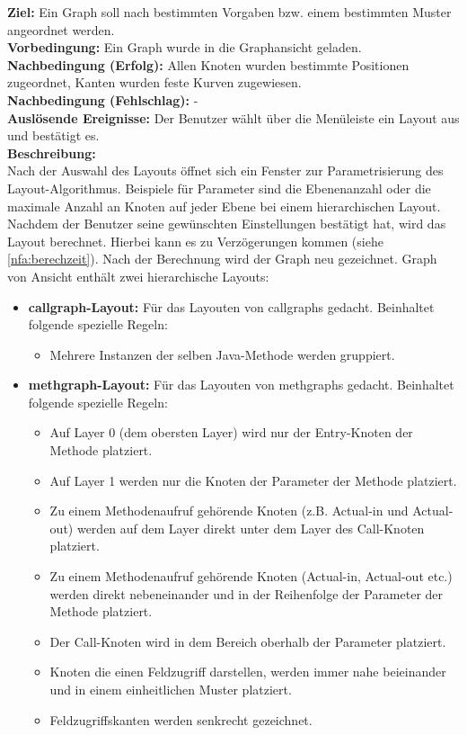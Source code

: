 \label{fa:layout}
\textbf{Ziel:} Ein Graph soll nach bestimmten Vorgaben bzw. einem bestimmten Muster angeordnet werden.\\
\textbf{Vorbedingung:} Ein Graph wurde in die Graphansicht geladen.\\
\textbf{Nachbedingung (Erfolg):} Allen Knoten wurden bestimmte Positionen zugeordnet, Kanten wurden feste Kurven zugewiesen.\\
\textbf{Nachbedingung (Fehlschlag):} -\\
\textbf{Auslösende Ereignisse:}
Der Benutzer wählt über die Menüleiste ein Layout aus und bestätigt es.\\
\textbf{Beschreibung:}\\
Nach der Auswahl des Layouts öffnet sich ein Fenster zur Parametrisierung des Layout-Algorithmus.
Beispiele für Parameter sind die Ebenenanzahl oder die maximale Anzahl an Knoten auf jeder Ebene bei einem hierarchischen Layout.
Nachdem der Benutzer seine gewünschten Einstellungen bestätigt hat, wird das Layout berechnet. Hierbei kann es zu Verzögerungen kommen (siehe \ref{nfa:berechzeit}).
Nach der Berechnung wird der Graph neu gezeichnet.
Graph von Ansicht enthält zwei hierarchische Layouts:
\begin{itemize}
  \item \textbf{\gls{callgraph}-Layout:} Für das Layouten von \glspl{callgraph} gedacht. Beinhaltet folgende spezielle Regeln:
    \begin{itemize}
      \item Mehrere Instanzen der selben Java-Methode werden gruppiert.
    \end{itemize}
  \item \textbf{\gls{methgraph}-Layout:} Für das Layouten von \glspl{methgraph} gedacht. Beinhaltet folgende spezielle Regeln:
    \begin{itemize}
      \item Auf Layer 0 (dem obersten Layer) wird nur der Entry-Knoten der Methode platziert.
      \item Auf Layer 1 werden nur die Knoten der Parameter der Methode platziert.
      \item Zu einem Methodenaufruf gehörende Knoten (z.B. Actual-in und Actual-out) werden auf dem Layer direkt unter dem Layer des Call-Knoten platziert.
      \item Zu einem Methodenaufruf gehörende Knoten (Actual-in, Actual-out etc.) werden direkt nebeneinander und in der Reihenfolge der Parameter der Methode platziert.
      \item Der Call-Knoten wird in dem Bereich oberhalb der Parameter platziert.
      \item Knoten die einen Feldzugriff darstellen, werden immer nahe beieinander und in einem einheitlichen Muster platziert. %
      \item Feldzugriffskanten werden senkrecht gezeichnet.
    \end{itemize}
\end{itemize}
